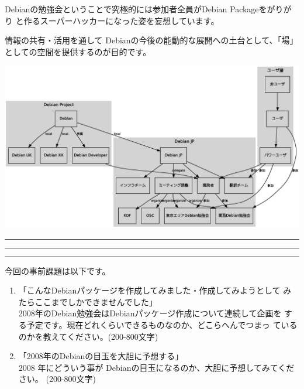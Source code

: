 \documentclass[mingoth,a4paper]{jsarticle}
\begin{document}
 Debianの勉強会ということで究極的には参加者全員がDebian Packageをがりがり
 と作るスーパーハッカーになった姿を妄想しています。

 情報の共有・活用を通して Debianの今後の能動的な展開への土台として、「場」
としての空間を提供するのが目的です。

\includegraphics[width=1\hsize]{image200712/debianmeetinganddebianjp.eps}

\newpage

\begin{minipage}[b]{0.2\hsize}
 \colorbox{titleback}{}
\end{minipage}
\begin{minipage}[b]{0.8\hsize}
\hrule
\vspace{2mm}
\hrule
\tableofcontents
\vspace{2mm}
\hrule
\end{minipage}


今回の事前課題は以下です。

\begin{enumerate}
 \item 「こんなDebianパッケージを作成してみました・作成してみようとして
       みたらここまでしかできませんでした」\\
       2008年のDebian勉強会はDebianパッケージ作成について連続して企画を
       する予定です。現在どれくらいできるものなのか、どこらへんでつまっ
       ているのかを教えてください。(200-800文字)

 \item 「2008年のDebianの目玉を大胆に予想する」\\ 2008 年にどういう事が
       Debianの目玉になるのか、大胆に予想してみてください。
       (200-800文字)
\end{enumerate}
\end{document}
